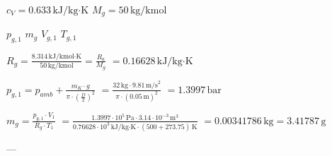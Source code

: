 \( c_V = 0.633 \, \text{kJ/kg·K} \)  
\( M_g = 50 \, \text{kg/kmol} \)  

\( p_{g,1} \)  
\( m_g \)  
\( V_{g,1} \)  
\( T_{g,1} \)  

\( R_g = \frac{8.314 \, \text{kJ/kmol·K}}{50 \, \text{kg/kmol}} = \frac{R_a}{M_g} \)  
\( = 0.16628 \, \text{kJ/kg·K} \)  

\( p_{g,1} = p_{amb} + \frac{m_K \cdot g}{\pi \cdot \left(\frac{D}{2}\right)^2} \)  
\( = \frac{32 \, \text{kg} \cdot 9.81 \, \text{m/s}^2}{\pi \cdot (0.05 \, \text{m})^2} \)  
\( = 1.3997 \, \text{bar} \)  

\( m_g = \frac{p_{g,1} \cdot V_{1}}{R_g \cdot T_1} \)  
\( = \frac{1.3997 \cdot 10^5 \, \text{Pa} \cdot 3.14 \cdot 10^{-3} \, \text{m}^3}{0.76628 \cdot 10^3 \, \text{kJ/kg·K} \cdot (500 + 273.75) \, \text{K}} \)  
\( = 0.00341786 \, \text{kg} = 3.41787 \, \text{g} \)  

---